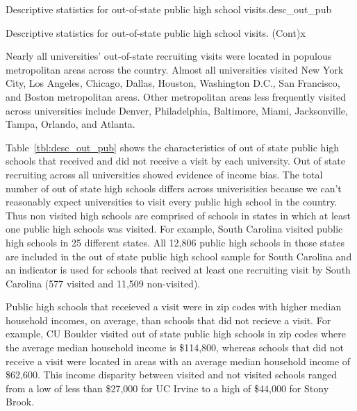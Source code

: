 \documentclass[twoside]{article}
\begin{document}
\begin{lscape-env}{Descriptive statistics for out-of-state public high school visits.}{desc_out_pub}
  
\end{lscape-env}

 \begin{lscape-env}{Descriptive statistics for out-of-state public high school visits. (Cont)}{x}
  
\end{lscape-env}

Nearly all universities' out-of-state recruiting visits were located in populous metropolitan areas across the country. Almost all universities visited New York City, Los Angeles, Chicago, Dallas, Houston, Washington D.C., San Francisco, and Boston metropolitan areas. Other metropolitan areas less frequently visited across universities include Denver, Philadelphia, Baltimore, Miami, Jacksonville, Tampa, Orlando, and Atlanta. 

Table~\ref{tbl:desc_out_pub} shows the characteristics of out of state public high schools that received and did not receive a visit by each university. Out of state recruiting across all universities showed evidence of income bias. The total number of out of state high schools differs across univerisities because we can't reasonably expect universities to visit every public high school in the country. Thus non visited high schools are comprised of schools in states in which at least one public high schools was visited. For example, South Carolina visited public high schools in 25 different states. All 12,806 public high schools in those states are included in the out of state public high school sample for South Carolina and an indicator is used for schools that recived at least one recruiting visit by South Carolina (577 visited and 11,509 non-visited).

Public high schools that receieved a visit were in zip codes with higher median household incomes, on average, than schools that did not recieve a visit. For example, CU Boulder visited out of state public high schools in zip codes where the average median household income is \$114,800, whereas schools that did not receive a visit were located in areas with an average median household income of \$62,600. This income disparity between visited and not visited schools ranged from a low of less than \$27,000 for UC Irvine to a high of \$44,000 for Stony Brook. 
\end{document}
